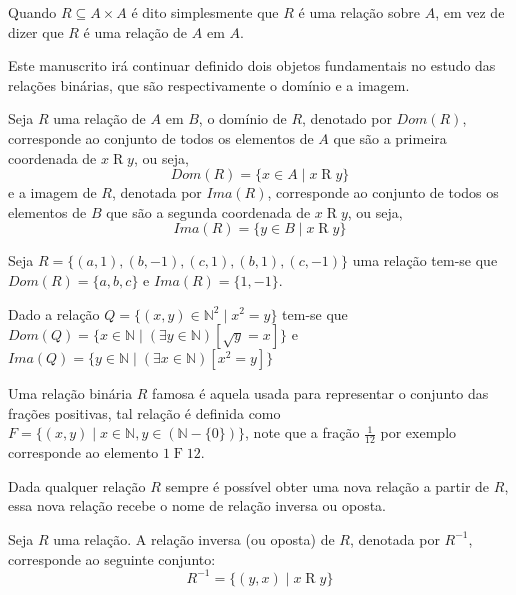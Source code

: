 \begin{rema}
	Quando $R \subseteq A \times A$ é dito simplesmente que $R$ é uma relação sobre $A$, em vez de dizer que $R$ é uma relação de $A$ em $A$.
\end{rema}

Este manuscrito irá continuar definido dois objetos fundamentais no estudo das relações binárias, que são respectivamente o domínio e a imagem.

\begin{definition}\label{def:DominioImagemRelacoes}
	Seja $R$ uma relação de $A$ em $B$, o domínio de $R$, denotado por $Dom(R)$, corresponde ao conjunto de todos os elementos de $A$ que são a primeira coordenada de $x\mathrel{R}y$, ou seja, 
	$$Dom(R) = \{x \in A \mid x\mathrel{R}y\}$$
 	e a imagem de $R$, denotada por $Ima(R)$, corresponde ao conjunto de todos os elementos de $B$ que são a segunda coordenada de $x\mathrel{R}y$, ou seja, 
	$$Ima(R) = \{y \in B \mid x\mathrel{R}y\}$$
\end{definition}

\begin{exem}\label{exe:RelacaoBinaria1}
	Seja $R = \{(a, 1), (b, -1), (c, 1), (b, 1), (c, -1)\}$ uma relação tem-se que $Dom(R) = \{a, b, c\}$ e $Ima(R) = \{1, -1\}$.
\end{exem}

\begin{exem}
	Dado a relação $Q = \{(x, y) \in \mathbb{N}^2 \mid x^2 = y\}$ tem-se que $Dom(Q) = \{x \in \mathbb{N} \mid (\exists y \in \mathbb{N})[\sqrt{y} = x]\}$ e $Ima(Q) = \{y \in \mathbb{N} \mid (\exists x \in \mathbb{N})[x^2 = y]\}$
\end{exem}

\begin{exem}
	Uma relação binária $R$ famosa é aquela usada para representar o conjunto das frações positivas, tal relação é definida como $F = \{(x, y)\mid x \in \mathbb{N}, y \in (\mathbb{N}-\{0\})\}$, note que a fração $\displaystyle\frac{1}{12}$ por exemplo corresponde ao elemento $1\mathrel{F}12$.
\end{exem}

Dada qualquer relação $R$ sempre é possível obter uma nova relação a partir de $R$, essa nova relação recebe o nome de relação inversa ou oposta.

\begin{definition}\label{def:RelacaoInversa}
	Seja $R$ uma relação. A relação inversa (ou oposta) de $R$, denotada por $R^{-1}$, corresponde ao seguinte conjunto:
	$$R^{-1} = \{(y,x) \mid x\mathrel{R}y\}$$
\end{definition}

